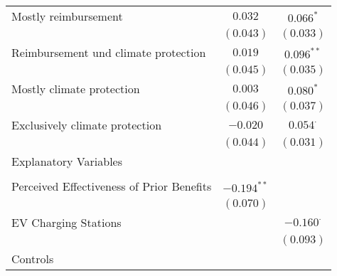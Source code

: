 \begin{center}
\begin{tiny}
\begin{longtable}{l@{} c@{} c@{}}
\quad Mostly reimbursement                                                                             & $0.032$         & $0.066^{*}$      \\
                                                                                                       & $(0.043)$       & $(0.033)$        \\
\quad Reimbursement und climate protection                                                             & $0.019$         & $0.096^{**}$     \\
                                                                                                       & $(0.045)$       & $(0.035)$        \\
\quad Mostly climate protection                                                                        & $0.003$         & $0.080^{*}$      \\
                                                                                                       & $(0.046)$       & $(0.037)$        \\
\quad Exclusively climate protection                                                                   & $-0.020$        & $0.054^{\cdot}$  \\
                                                                                                       & $(0.044)$       & $(0.031)$        \\
Explanatory Variables                                                                                  &                 &                  \\
                                                                                                       &                 &                  \\
\quad Perceived Effectiveness of Prior Benefits                                                        & $-0.194^{**}$   &                  \\
                                                                                                       & $(0.070)$       &                  \\
\quad EV Charging Stations                                                                             &                 & $-0.160^{\cdot}$ \\
                                                                                                       &                 & $(0.093)$        \\
Controls                                                                                               &                 &                  \\

\end{longtable}
\end{tiny}
\end{center}
